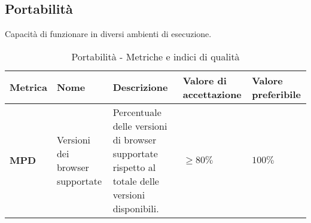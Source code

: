 \subsection{Portabilità}
Capacità di funzionare in diversi ambienti di esecuzione. 
\begin{table}[H]
    \centering
    \begin{tabular}{|C{1.5cm}|L{3cm}|L{4cm}|L{2.5cm}|L{2.5cm}|}
        \hline
        \textbf{Metrica} & \textbf{Nome} & \textbf{Descrizione} & \textbf{Valore di accettazione} & \textbf{Valore preferibile} \\
        \hline
        \textbf{MPD} & Versioni dei browser supportate & Percentuale delle versioni di browser supportate rispetto al totale delle versioni disponibili. & $\geq 80\%$ & $100\%$ \\
        \hline
    \end{tabular}
    \caption{Portabilità - Metriche e indici di qualità}
    \label{tab:portabilità_qualita_prodotto}
\end{table}
